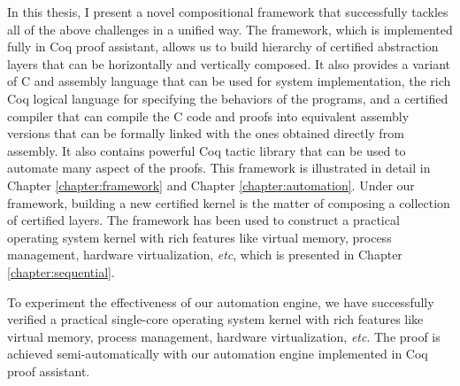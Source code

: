 {In this thesis, I present a novel compositional  framework that successfully
tackles all of the above challenges in a unified way. The framework,
which is implemented fully in Coq proof assistant, allows
us to build hierarchy of certified abstraction layers that can be horizontally
and vertically composed. It also provides a variant of C and assembly language
that can be used for system implementation, the rich Coq logical language
for specifying the behaviors of the programs, and a certified compiler that can compile
the C code and proofs into equivalent assembly versions that can be formally linked
with the ones obtained directly from assembly. It also contains powerful
Coq tactic library that can be used to automate many aspect of the proofs.
This framework is illustrated in
detail in Chapter \ref{chapter:framework} and Chapter \ref{chapter:automation}.
Under our framework, building a new certified kernel is the matter of
composing a collection of certified layers. The framework has been used to
construct a practical operating system kernel with rich features like virtual
memory, process management, hardware virtualization, {\it etc}, which is
presented in Chapter \ref{chapter:sequential}.
}

To experiment the effectiveness of our automation engine, 
we have successfully verified a practical single-core
operating system kernel with rich features like virtual
memory, process management, hardware virtualization, {\it etc}.
The proof is achieved semi-automatically with our automation
engine implemented in Coq proof assistant.



